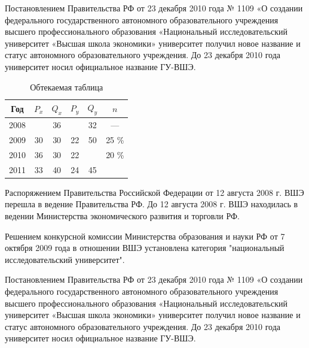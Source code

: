 \documentclass[a4paper,12pt]{article}
\begin{document}
Постановлением Правительства РФ от 23 декабря 2010 года № 1109 «О создании федерального государственного автономного образовательного учреждения высшего профессионального образования «Национальный исследовательский университет «Высшая школа экономики» университет получил новое название и статус автономного образовательного учреждения. До 23 декабря 2010 года университет носил официальное название ГУ-ВШЭ.

\begin{table}
		\begin{tabular}{|c|c|c|c|c|c|}
			\hline
			Год & $P_x$ &$Q_x$ & $P_y$ & $Q_y$ & $n$\\ \hline
			2008 &  & 36 &  & 32 & — \\ \hline
			2009 & 30 & 30 & 22 & 50 & 25 \% \\ \hline
			2010 & 36 & 30 & 22 &  & 20 \% \\ \hline
			2011 & 33 & 40 & 24 & 45 & \\ \hline
		\end{tabular}
		\caption{Обтекаемая таблица}
\end{table}Распоряжением Правительства Российской Федерации от 12 августа 2008 г. ВШЭ перешла в ведение Правительства РФ. До 12 августа 2008 г. ВШЭ находилась в ведении Министерства экономического развития и торговли РФ.

Решением конкурсной комиссии Министерства образования и науки РФ от 7 октября 2009 года в отношении ВШЭ установлена категория "национальный исследовательский университет". 

Постановлением Правительства РФ от 23 декабря 2010 года № 1109 «О создании федерального государственного автономного образовательного учреждения высшего профессионального образования «Национальный исследовательский университет «Высшая школа экономики» университет получил новое название и статус автономного образовательного учреждения. До 23 декабря 2010 года университет носил официальное название ГУ-ВШЭ.

\listoffigures

\listoftables
\end{document}
